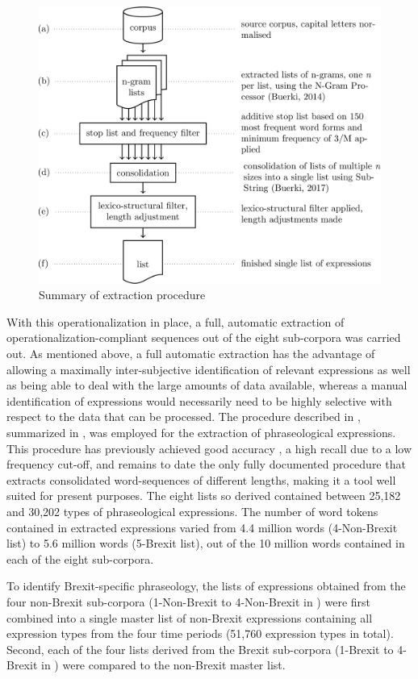 \documentclass[output=paper]{langscibook}
\begin{document}
  
\begin{figure}
\includegraphics[width=\textwidth]{figures/buerki-figure3.pdf}
\caption{Summary of extraction procedure\label{fig:buerki:3}}
\end{figure}

With this operationalization in place, a full, automatic extraction of operationalization-compliant sequences out of the eight sub-corpora was carried out. As mentioned above, a full automatic extraction has the advantage of allowing a maximally inter-subjective identification of relevant expressions as well as being able to deal with the large amounts of data available, whereas a manual identification of expressions would necessarily need to be highly selective with respect to the data that can be processed. The procedure described in \citet{Buerki2016}, summarized in , was employed for the extraction of phraseological expressions. This procedure has previously achieved good accuracy \citep[23]{Buerki2016}, a high recall due to a low frequency cut-off, and remains to date the only fully documented procedure that extracts consolidated word-sequences of different lengths, making it a tool well suited for present purposes. The eight lists so derived contained between 25,182 and 30,202 types of phraseological expressions. The number of word tokens contained in extracted expressions varied from 4.4 million words (4-Non-Brexit list) to 5.6 million words (5-Brexit list), out of the 10 million words contained in each of the eight sub-corpora.

To identify Brexit-specific phraseology, the lists of expressions obtained from the four non-Brexit sub-corpora (1-Non-Brexit to 4-Non-Brexit in ) were first combined into a single master list of non-Brexit expressions containing all expression types from the four time periods (51,760 expression types in total). Second, each of the four lists derived from the Brexit sub-corpora (1-Brexit to 4-Brexit in ) were compared to the non-Brexit master list.
\end{document}
